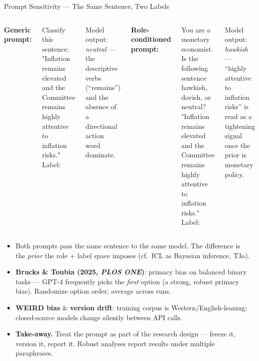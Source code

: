 \begin{frame}{Prompt Sensitivity --- The Same Sentence, Two Labels}
\begin{columns}[T]
\textbf{Generic prompt:}
\begin{tcolorbox}[colback=blue!3, colframe=RedTitle!50, boxrule=0.3mm, arc=1mm, left=2mm, right=2mm, top=1mm, bottom=1mm]
\scriptsize\ttfamily
Classify this sentence:\\
"Inflation remains elevated and the Committee remains highly attentive to inflation risks."\\
Label:
\end{tcolorbox}
\smallskip
{\footnotesize Model output: \textit{neutral} --- the descriptive verbs (``remains'') and the absence of a directional action word dominate.}

\textbf{Role-conditioned prompt:}
\begin{tcolorbox}[colback=green!3, colframe=green!45!black, boxrule=0.3mm, arc=1mm, left=2mm, right=2mm, top=1mm, bottom=1mm]
\scriptsize\ttfamily
You are a monetary economist. Is the following sentence hawkish, dovish, or neutral?\\
"Inflation remains elevated and the Committee remains highly attentive to inflation risks."\\
Label:
\end{tcolorbox}
\smallskip
{\footnotesize Model output: \textit{hawkish} --- ``highly attentive to inflation risks'' is read as a tightening signal once the prior is monetary policy.}
\end{columns}

\medskip
\footnotesize
\begin{itemize}\itemsep1pt
\item Both prompts pass the same sentence to the same model. The difference is the \emph{prior} the role + label space imposes (cf.\ ICL as Bayesian inference, T3a).
\item \textbf{Brucks \& Toubia (2025, \emph{PLOS ONE})}: primacy bias on balanced binary tasks --- GPT-4 frequently picks the \emph{first} option (a strong, robust primacy bias). Randomize option order; average across runs.
\item \textbf{WEIRD bias} \& \textbf{version drift}: training corpus is Western/English-leaning; closed-source models change silently between API calls.
\item \textbf{Take-away.} Treat the prompt as part of the research design --- freeze it, version it, report it. Robust analyses report results under multiple paraphrases.
\end{itemize}
\end{frame}

